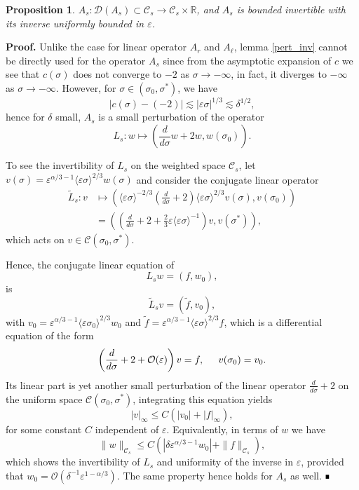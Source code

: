 \documentclass[letterpaper,11pt]{article}
\newcommand{\rmO}{\mathcal{O}}
\newcommand{\eps}{\varepsilon}
\newcommand{\lar}{ \lesssim }
\numberwithin{equation}{section}
\theoremstyle{plain}
\newtheorem{proposition}[theorem]{Proposition}
\newenvironment{Proof}[1][.]%
 {\begin{trivlist}\item[]\textbf{Proof#1 }}%
 {\hspace*{\fill}$\rule{0.3\baselineskip}{0.35\baselineskip}$\end{trivlist}}
\begin{document}
\begin{proposition}\label{inv_A_s}
$A_s : \mathcal{D}(A_s) \subset \mathcal{C}_s \to \mathcal{C}_s \times \mathbb{R}$, and $A_s$ is bounded invertible with its inverse uniformly bounded in $\eps$.
\end{proposition}
\begin{Proof}Unlike the case for linear operator $A_r$ and $A_\ell$, lemma \ref{pert_inv} cannot be directly used for the operator $A_s$ since from the asymptotic expansion of $c$ we see that $c(\sigma)$ does not converge to $-2$ as $\sigma \to -\infty$, in fact, it diverges to $-\infty$ as $\sigma \to -\infty$. 
However, for $\sigma \in (\sigma_0, \sigma^*)$, we have
\[
|c(\sigma) - (-2) | \lar |\eps\sigma|^{1/3} \lar \delta^{1/2},
\]
hence for $\delta$ small, $A_s$ is a small perturbation of the operator
\[
L_s : w \mapsto \left( \frac{d}{d\sigma}w+2w, w(\sigma_0)\right).
\]

To see the invertibility of $L_s$ on the weighted space $\mathcal{C}_s$, let $v(\sigma) = \eps^{\alpha/3-1}\langle \eps \sigma \rangle^{2/3}w(\sigma)$ and consider the conjugate linear operator
\begin{align*}
\tilde{L}_s: v &\mapsto \left( \langle \eps \sigma \rangle^{-2/3}\left(\frac{d}{d\sigma} + 2\right) \langle \eps \sigma \rangle^{2/3} v(\sigma), v(\sigma_0) \right)\\
&= \left( \left(\frac{d}{d\sigma}+2+\frac{2}{3}\eps\langle \eps\sigma \rangle^{-1}\right)  v, v(\sigma^*) \right),
\end{align*}
which acts on $v \in \mathcal{C}(\sigma_0, \sigma^*)$. 

Hence, the conjugate linear equation of 
\[
L_s w = (f,w_0),
\]
is 
\[
\tilde{L}_s v = (\tilde{f}, v_0),
\]
with $v_0 = \eps^{\alpha/3-1}\langle \eps \sigma_0 \rangle^{2/3} w_0$ and $\tilde{f} = \eps^{\alpha/3-1}\langle \eps \sigma \rangle^{2/3}f$, which is a differential equation of the form
\[
\left( \frac{d}{d\sigma}+2+\rmO(\eps) \right) v =f, \hspace{0.2in} v(\sigma_0) = v_0.
\]
Its linear part is yet another small perturbation of the linear operator $\frac{d}{d\sigma}+2$ on the uniform space $\mathcal{C}(\sigma_0, \sigma^*)$, integrating this equation yields
\[
|v|_\infty \le C(|v_0|+|f|_\infty),
\]
for some constant $C$ independent of $\eps$. Equivalently, in terms of $w$ we have
\begin{equation}\label{linear_est:s}
\|w\|_{\mathcal{C}_s} \le C(|\delta \eps^{\alpha/3-1}w_0|+ \|f\|_{\mathcal{C}_s}),
\end{equation}
which shows the invertibility of $L_s$ and uniformity of the inverse in $\eps$, provided that $w_0 = \rmO(\delta^{-1} \eps^{1-\alpha/3})$. The same property hence holds for $A_s$ as well.
\end{Proof}
\end{document}
